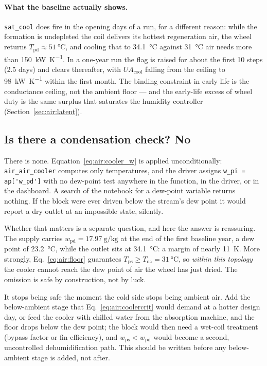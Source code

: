\documentclass[11pt]{article}
\providecommand{\celsius}{\degreeCelsius}
\newcommand{\UA}{\ensuremath{U\!A}}
\begin{document}
\paragraph{What the baseline actually shows.} \texttt{sat\_cool} does fire in
the opening days of a run, for a different reason: while the formation is
undepleted the coil delivers its hottest regeneration air, the wheel returns
$T_{\mathrm{pd}}\approx\SI{51}{\celsius}$, and cooling that to
\SI{34.1}{\celsius} against \SI{31}{\celsius} air needs more than
\SI{150}{\kilo\watt\per\kelvin}. In a one-year run the flag is raised for about
the first \num{10} steps (\num{2.5} days) and clears thereafter, with
$\UA_{\mathrm{cool}}$ falling from the ceiling to
\SI{98}{\kilo\watt\per\kelvin} within the first month. The binding constraint
in early life is the conductance ceiling, not the ambient floor --- and the
early-life excess of wheel duty is the same surplus that saturates the humidity
controller (Section~\ref{sec:air:latent}).

\subsection{Is there a condensation check? No}
\label{sec:air:condense}

There is none. Equation~\eqref{eq:air:cooler_w} is applied unconditionally:
\texttt{air\_air\_cooler} computes only temperatures, and the driver assigns
\verb|w_pi = ap['w_pd']| with no dew-point test anywhere in the function, in
the driver, or in the dashboard. A search of the notebook for a dew-point
variable returns nothing. If the block were ever driven below the stream's dew
point it would report a dry outlet at an impossible state, silently.

Whether that matters is a separate question, and here the answer is
reassuring. The supply carries $w_{\mathrm{pd}}=\SI{17.97}{\gram\per\kilogram}$
at the end of the first baseline year, a dew point of \SI{23.2}{\celsius},
while the outlet sits at \SI{34.1}{\celsius}: a margin of nearly
\SI{11}{\kelvin}. More strongly, Eq.~\eqref{eq:air:floor} guarantees
$T_{\mathrm{ps}}\ge T_{\mathrm{oa}}=\SI{31}{\celsius}$, so \emph{within this
topology} the cooler cannot reach the dew point of air the wheel has just
dried. The omission is safe by construction, not by luck.

It stops being safe the moment the cold side stops being ambient air. Add the
below-ambient stage that Eq.~\eqref{eq:air:coolercrit} would demand at a hotter
design day, or feed the cooler with chilled water from the absorption machine,
and the floor drops below the dew point; the block would then need a wet-coil
treatment (bypass factor or fin-efficiency), and $w_{\mathrm{ps}}<
w_{\mathrm{pd}}$ would become a second, uncontrolled dehumidification path.
This should be written before any below-ambient stage is added, not after.
\end{document}
